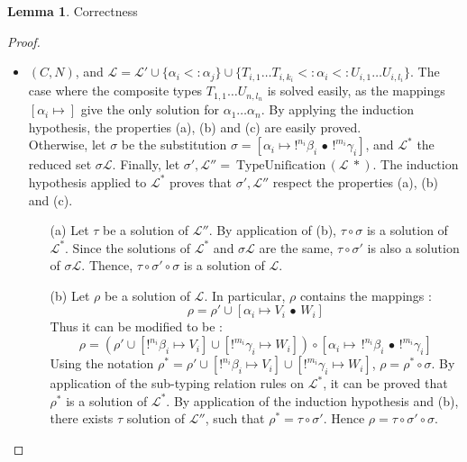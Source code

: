 \documentclass[10pt]{article}
\theoremstyle{plain}
\theoremstyle{definition}
\newtheorem{lemma}{Lemma}[section]
\begin{document}
\begin{lemma}{Correctness}
\begin{proof}
\begin{itemize}
			\item $(C, N)$, and $\mathcal{L} = \mathcal{L'} \cup \{ \alpha_i <: \alpha_j \} \cup
				\{ T_{i, 1} \dots T_{i, k_i} <: \alpha_i <: U_{i, 1} \dots U_{i, l_i} \}$.
				The case where the composite types $T_{1, 1} \dots U_{n, l_n}$ is solved easily, as the mappings $[\alpha_i \mapsto]$ give the
				only solution for $\alpha_1 \dots \alpha_n$. By applying the induction hypothesis, the properties (a), (b) and (c) are easily
				proved. \\
				
				Otherwise, let $\sigma$ be the substitution $\sigma = [\alpha_i \mapsto !^{n_i}\beta_i \,\bullet\, !^{m_i}\gamma_i]$, and
				$\mathcal{L}^*$ the reduced set $\sigma \mathcal{L}$. Finally, let $\sigma', \mathcal{L''} = ~\text{TypeUnification}\,(\mathcal{L}~*)$.
				The induction hypothesis applied to $\mathcal{L}^*$ proves that $\sigma', \mathcal{L''}$ respect the properties (a), (b) and (c).
					\begin{itemize}
						\item[(a)] Let $\tau$ be a solution of $\mathcal{L''}$. By application of (b), $\tau \circ \sigma$ is a solution of $\mathcal{L}^*$.
							Since the solutions of $\mathcal{L}^*$ and $\sigma \mathcal{L}$ are the same, $\tau \circ \sigma'$ is also a solution of
							$\sigma \mathcal{L}$. Thence, $\tau \circ \sigma' \circ \sigma$ is a solution of $\mathcal{L}$.
							
						\item[(b)] Let $\rho$ be a solution of $\mathcal{L}$. In particular, $\rho$ contains the mappings :
								$$\rho = \rho' \cup [\alpha_i \mapsto V_i \,\bullet\, W_i]$$
							Thus it can be modified to be :
								$$\rho = (\rho' \cup [!^{n_i}\beta_i \mapsto V_i] \cup [!^{m_i}\gamma_i \mapsto W_i]) \circ
									[\alpha_i \mapsto \,!^{n_i}\beta_i \,\bullet\, !^{m_i}\gamma_i]$$
							Using the notation $\rho^* = \rho' \cup [!^{n_i}\beta_i \mapsto V_i] \cup [!^{m_i}\gamma_i \mapsto W_i]$,
							$\rho = \rho^* \circ \sigma$. By application of the sub-typing relation rules on $\mathcal{L}^*$, it can be proved
							that $\rho^*$ is a solution of $\mathcal{L}^*$. By application of the induction hypothesis and (b), there exists
							$\tau$ solution of $\mathcal{L''}$, such that $\rho^* = \tau \circ \sigma'$. Hence $\rho = \tau \circ \sigma' \circ \sigma$.
					\end{itemize}
		\end{itemize}
	\end{proof}
\end{lemma}
\end{document}

